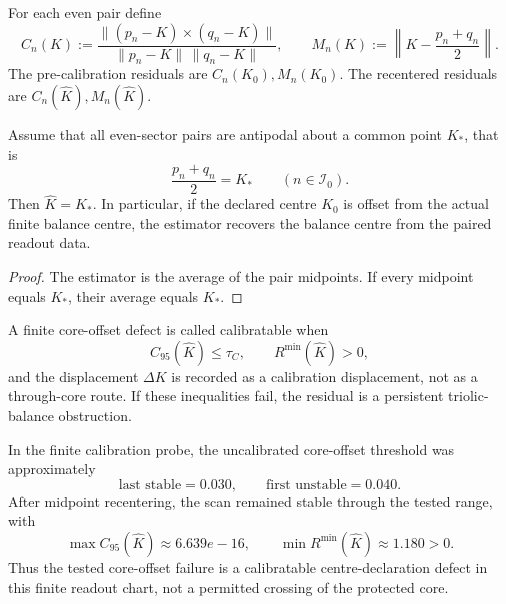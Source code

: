 \begin{definition}
\label{def:recentered-triolic-residuals}
For each even pair define
\[
    C_n(K)
    :=
    \frac{\|(p_n-K)\times(q_n-K)\|}
         {\|p_n-K\|\,\|q_n-K\|},
    \qquad
    M_n(K):=\left\|K-\frac{p_n+q_n}{2}\right\| .
\]
The pre-calibration residuals are \(C_n(K_0),M_n(K_0)\).  The recentered
residuals are \(C_n(\widehat K),M_n(\widehat K)\).
\end{definition}

\begin{lemma}
\label{lem:midpoint-recovery-antipodal}
Assume that all even-sector pairs are antipodal about a common point \(K_*\),
that is
\[
    \frac{p_n+q_n}{2}=K_*
    \qquad(n\in\mathcal I_0).
\]
Then \(\widehat K=K_*\).  In particular, if the declared centre \(K_0\) is
offset from the actual finite balance centre, the estimator recovers the
balance centre from the paired readout data.
\end{lemma}

\begin{proof}
The estimator is the average of the pair midpoints.  If every midpoint equals
\(K_*\), their average equals \(K_*\).
\end{proof}

\begin{proposition}
\label{prop:finite-recentering-criterion}
A finite core-offset defect is called calibratable when
\[
    C_{95}(\widehat K)\leq \tau_C,
    \qquad
    R^{\min}(\widehat K)>0,
\]
and the displacement \(\Delta K\) is recorded as a calibration displacement,
not as a through-core route.  If these inequalities fail, the residual is a
persistent triolic-balance obstruction.
\end{proposition}

\begin{remark}
\label{rem:numerical-core-recentering-instance}
In the finite calibration probe, the uncalibrated core-offset threshold was
approximately
\[
    \text{last stable}=0.030,
    \qquad
    \text{first unstable}=0.040 .
\]
After midpoint recentering, the scan remained stable through the tested range,
with
\[
    \max C_{95}(\widehat K)
    \approx 6.639e-16,
    \qquad
    \min R^{\min}(\widehat K)
    \approx 1.180>0 .
\]
Thus the tested core-offset failure is a calibratable centre-declaration defect
in this finite readout chart, not a permitted crossing of the protected core.
\end{remark}


